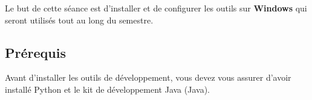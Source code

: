 
\usepackage{menukeys}
\usepackage{fontawesome6}
\usepackage{graphicx}
\usepackage{breakurl}

\usepackage{subcaption}
\usepackage{tikz}
\usetikzlibrary{arrows.meta}



\ShowSolutiontrue
\ShowConseiltrue
\ShowWarningtrue
\ShowNotetrue

\titre
{}

Le but de cette séance est d'installer et de configurer les outils sur \textbf{Windows} qui seront utilisés tout au long du semestre. 

\subsection*{Prérequis}
Avant d'installer les outils de développement, vous devez vous assurer d'avoir installé Python et le kit de développement Java (Java).
